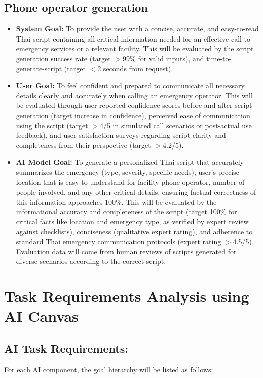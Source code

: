 \subsection{Phone operator generation}
\label{subsec:goal_phone_operator}
\begin{itemize}
    \item \textbf{System Goal:} To provide the user with a concise, accurate, and easy-to-read Thai script containing all critical information needed for an effective call to emergency services or a relevant facility. This will be evaluated by the script generation success rate (target $>$99\% for valid inputs), and time-to-generate-script (target $<$2 seconds from request).
    \item \textbf{User Goal:} To feel confident and prepared to communicate all necessary details clearly and accurately when calling an emergency operator. This will be evaluated through user-reported confidence scores before and after script generation (target increase in confidence), perceived ease of communication using the script (target $>$4/5 in simulated call scenarios or post-actual use feedback), and user satisfaction surveys regarding script clarity and completeness from their perspective (target $>$4.2/5).
    \item \textbf{AI Model Goal:} To generate a personalized Thai script that accurately summarizes the emergency (type, severity, specific needs), user's precise location that is easy to understand for facility phone operator, number of people involved, and any other critical details, ensuring factual correctness of this information approaches 100\%. This will be evaluated by the informational accuracy and completeness of the script (target 100\% for critical facts like location and emergency type, as verified by expert review against checklists), conciseness (qualitative expert rating), and adherence to standard Thai emergency communication protocols (expert rating $>$4.5/5). Evaluation data will come from human reviews of scripts generated for diverse scenarios according to the correct script.
\end{itemize}

\section{Task Requirements Analysis using AI Canvas}
\label{sec:task_requirements_analysis}

\subsection{AI Task Requirements:}
\label{subsec:ai_task_requirements_intro}
For each AI component, the goal hierarchy will be listed as follows: %

